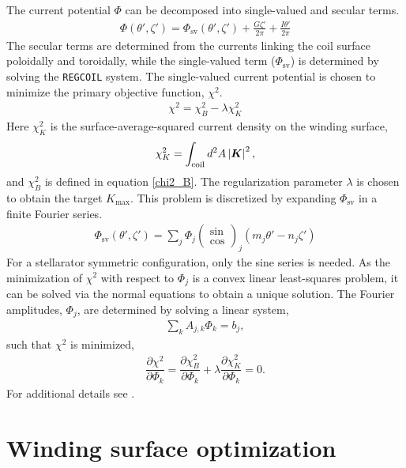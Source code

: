 \documentclass[aps,unsortedaddress]{revtex4-1}
\newcommand{\partder}[2]{\dfrac{\partial  #1}{\partial  #2}}
\begin{document}
The current potential $\Phi$ can be decomposed into single-valued and secular terms.
\begin{gather}
\Phi(\theta', \zeta') = \Phi_{\text{sv}}(\theta',\zeta') + \frac{ G \zeta'}{2 \pi} + \frac{I \theta'}{2 \pi}
\end{gather}
The secular terms are determined from the currents linking the coil surface poloidally and toroidally, while the single-valued term ($\Phi_{\text{sv}}$) is determined by solving the \texttt{REGCOIL} system. The single-valued current potential is chosen to minimize the primary objective function, $\chi^2$.
\begin{gather}
\chi^2 = \chi^2_B - \lambda \chi^2_K
\label{primary_objective}
\end{gather}
Here $\chi^2_K$ is the surface-average-squared current density on the winding surface,
\begin{gather}
\chi^2_K = \int_{\text{coil}} d^2A \, \abs{\bm{K}}^2,
\end{gather}
and $\chi^2_B$ is defined in equation \ref{chi2_B}. The regularization parameter $\lambda$ is chosen to obtain the target $K_{\text{max}}$. This problem is discretized by expanding $\Phi_{\text{sv}}$ in a finite Fourier series.
\begin{gather}
\Phi_{\text{sv}}(\theta',\zeta') = \sum_j \Phi_j \left( \begin{array}{c} \sin \\ \cos \end{array} \right)_j (m_j \theta' - n_j \zeta')
\end{gather}
For a stellarator symmetric configuration, only the sine series is needed. As the minimization of $\chi^2$ with respect to $\Phi_{j}$ is a convex linear least-squares problem, it can be solved via the normal equations to obtain a unique solution. The Fourier amplitudes, $\Phi_j$, are determined by solving a linear system,
\begin{gather}
\sum_k A_{j,k} \Phi_k = b_j,
\label{forward}
\end{gather}
such that $\chi^2$ is minimized,
\begin{gather}
\partder{\chi^2}{\Phi_k} = \partder{\chi^2_B}{\Phi_k} + \lambda \partder{\chi^2_K}{\Phi_k} = 0.
\label{regcoil_minimization}
\end{gather}
For additional details see \cite{Landreman2017}.

\section{Winding surface optimization}
\label{sect_opt}
\FloatBarrier
\end{document}
